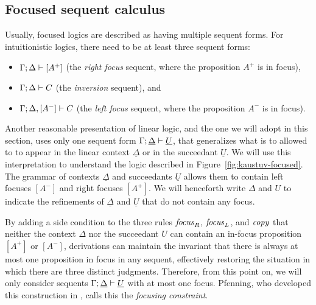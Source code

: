 \subsection{Focused sequent calculus}
\label{sec:linfocseqcalcdef}

Usually, focused logics are described as having multiple sequent
forms. For intuitionistic logics, there need to be at least three
sequent forms:
\begin{itemize}
\item ${\Gamma};{\Delta} \vdash [{A^+}] \mathstrut$ (the {\it right focus} sequent, where
the proposition $A^+$ is in focus),
\item ${\Gamma};{\Delta} \vdash {C} \mathstrut$ (the {\it inversion} sequent), and
\item ${\Gamma};{\Delta}, [{A^-}] \vdash {C} \mathstrut$ (the {\it left focus} sequent,
where the proposition $A^-$ is in focus).
\end{itemize}
Another reasonable presentation of linear logic, and the one we will
adopt in this section, uses only one sequent form
${\Gamma};{\underline{\Delta}} \vdash {\underline{U}} \mathstrut$, that
generalizes what is to allowed to to appear in the linear context
$\underline{\Delta}$ or in the succeedant $\underline{U}$. We will use
this interpretation to understand the logic described in
Figure~\ref{fig:kaustuv-focused}. The grammar of contexts
$\underline{\Delta}$ and succeedants $\underline{U}$ allows them to
contain left focuses $[ A^- ]$ and right focuses $[ A^+ ]$. We will
henceforth write $\Delta$ and $U$ to indicate the refinements of
$\underline{\Delta}$ and $\underline{U}$ that do not contain any
focus.



By adding a side condition to the three rules ${\it focus}_R$, ${\it
  focus}_L$, and ${\it copy}$ that neither the context $\Delta$ nor
the succeedant $U$ can contain an in-focus proposition $[A^+]$ or
$[A^-]$, derivations can maintain the invariant that there is always
at most one proposition in focus in any sequent, effectively restoring
the situation in which there are three distinct
judgments.%
Therefore, from this point on, we
will only consider sequents
${\Gamma};{\underline{\Delta}} \vdash {\underline{U}} \mathstrut$ with at most one
focus. Pfenning, who developed this construction in
\cite{pfenning12chaining}, calls this the {\it focusing constraint}.

